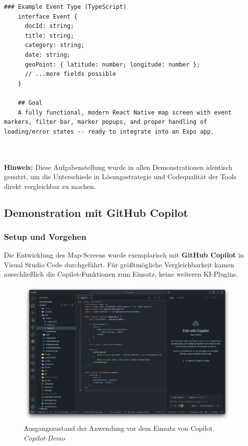 \begin{lstlisting}[]
    ### Example Event Type (TypeScript)
    interface Event {
      docId: string;
      title: string;
      category: string;
      date: string;
      geoPoint: { latitude: number; longitude: number };
      // ...more fields possible
    }

    ## Goal
    A fully functional, modern React Native map screen with event markers, filter bar, marker popups, and proper handling of loading/error states -- ready to integrate into an Expo app.

    
    \end{lstlisting}

\noindent
\textbf{Hinweis:} Diese Aufgabenstellung wurde in allen Demonstrationen identisch genutzt, um die Unterschiede in Lösungsstrategie und Codequalität der Tools direkt vergleichbar zu machen.

\subsection{Demonstration mit GitHub Copilot}

\subsubsection{Setup und Vorgehen}
Die Entwicklung des Map-Screens wurde exemplarisch mit \textbf{GitHub Copilot}
in Visual Studio Code durchgeführt. Für größtmögliche Vergleichbarkeit kamen
ausschließlich die Copilot-Funktionen zum Einsatz, keine weiteren KI-Plugins.

\begin{figure}[htbp]
      \centering
      \includegraphics[width=1\textwidth]{images/copilot_screenshots/Screenshots Ist-Zustand-copilot.png}
      \caption{Ausgangszustand der Anwendung vor dem Einsatz von Copilot. \textit{Copilot-Demo}}
      \label{fig:copilot-istzustand}
\end{figure}

